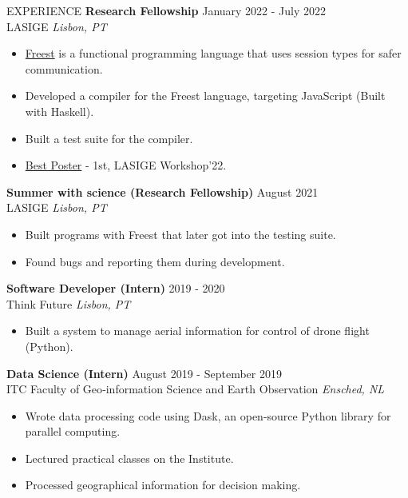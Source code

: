 \documentclass{resume} %
\begin{document}
\begin{rSection}{EXPERIENCE}
  \textbf{Research Fellowship} \hfill January 2022 - July 2022\\
  LASIGE \hfill \textit{Lisbon, PT}
  \begin{itemize}
    \itemsep -3pt {}
  \item \href{http://rss.di.fc.ul.pt/tryit/FreeST}{Freest} is a functional programming language
    that uses session types for safer communication.
  \item Developed a compiler for the Freest language, targeting JavaScript (Built with Haskell).
  \item Built a test suite for the compiler.
  \item \href{https://alf0nso.github.io/docs/FreeSTwebCompiler.pdf}{Best Poster} - 1st, LASIGE Workshop'22.
  \end{itemize}

  \textbf{Summer with science (Research Fellowship)} \hfill August 2021 \\
  LASIGE \hfill \textit{Lisbon, PT}
  \begin{itemize}
    \itemsep -3pt {} 
  \item Built programs with Freest that later got into the testing suite.
  \item Found bugs and reporting them during development.
  \end{itemize}

  \textbf{Software Developer (Intern)} \hfill 2019 - 2020 \\
  Think Future \hfill \textit{Lisbon, PT}
  \begin{itemize}
    \itemsep -3pt {} 
  \item Built a system to manage aerial information for control of drone flight (Python).
  \end{itemize}

  \textbf{Data Science (Intern)} \hfill August 2019 - September 2019 \\
  ITC Faculty of Geo‑information Science and Earth Observation \hfill \textit{Ensched, NL}
  \begin{itemize}
    \itemsep -3pt {} 
  \item Wrote data processing code using Dask, an open-source Python library for parallel computing.
  \item Lectured practical classes on the Institute.
  \item Processed geographical information for decision making.
  \end{itemize}
\end{rSection} 
\end{document}
